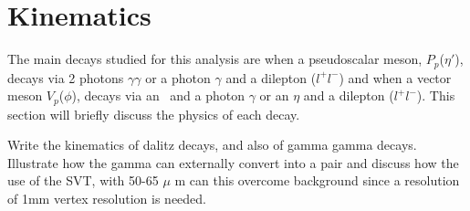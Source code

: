 \section{Kinematics}\label{sec:kinematics}
The main decays studied for this analysis are when a pseudoscalar meson, $P_p$($\eta'$), decays via 2 photons $\gamma \gamma$ or a photon $\gamma$ and a dilepton ($l^{+}l^{-}$) and when a vector meson $V_p$($\phi$), decays via an \etaT \  and a photon $\gamma$ or an $\eta$ and a dilepton ($l^{+}l^{-}$). This section will briefly discuss the physics of each decay.

Write the kinematics of dalitz decays, and also of gamma gamma decays. Illustrate how the gamma can externally convert into a \epem pair and discuss how the use of the SVT, with 50-65 $\mu$ m can this overcome background since a resolution of 1mm vertex resolution is needed.
